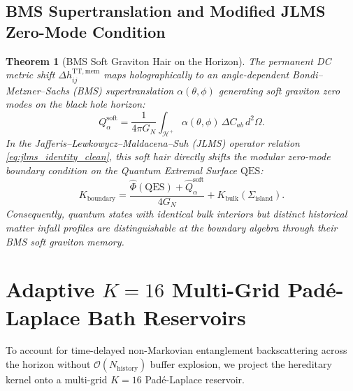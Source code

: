 \documentclass[11pt,a4paper,reqno]{article}
\newtheorem{theorem}{Theorem}[section]
\theoremstyle{definition}
\numberwithin{equation}{section}
\begin{document}
\subsection{BMS Supertranslation and Modified JLMS Zero-Mode Condition}
\begin{theorem}[BMS Soft Graviton Hair on the Horizon]
The permanent DC metric shift $\Delta h_{ij}^{\mathrm{TT, mem}}$ maps holographically to an angle-dependent Bondi--Metzner--Sachs (BMS) supertranslation $\alpha(\theta, \phi)$ generating soft graviton zero modes on the black hole horizon:
\begin{equation}
Q_{\alpha}^{\mathrm{soft}} = \frac{1}{4\pi G_N} \int_{\mathcal{H}^+} \alpha(\theta, \phi) \, \Delta C_{ab} \, d^2\Omega.
\end{equation}
In the Jafferis--Lewkowycz--Maldacena--Suh (JLMS) operator relation \eqref{eq:jlms_identity_clean}, this soft hair directly shifts the modular zero-mode boundary condition on the Quantum Extremal Surface $\mathrm{QES}$:
\begin{equation}
K_{\mathrm{boundary}} = \frac{\hat{\Phi}(\mathrm{QES}) + \hat{Q}_{\alpha}^{\mathrm{soft}}}{4 G_N} + K_{\mathrm{bulk}}(\Sigma_{\mathrm{island}}).
\label{eq:modified_jlms_soft}
\end{equation}
Consequently, quantum states with identical bulk interiors but distinct historical matter infall profiles are distinguishable at the boundary algebra through their BMS soft graviton memory.
\end{theorem}

\section{Adaptive $K=16$ Multi-Grid Padé-Laplace Bath Reservoirs}
To account for time-delayed non-Markovian entanglement backscattering across the horizon without $\mathcal{O}(N_{\mathrm{history}})$ buffer explosion, we project the hereditary kernel onto a multi-grid $K=16$ Padé-Laplace reservoir.
\end{document}
